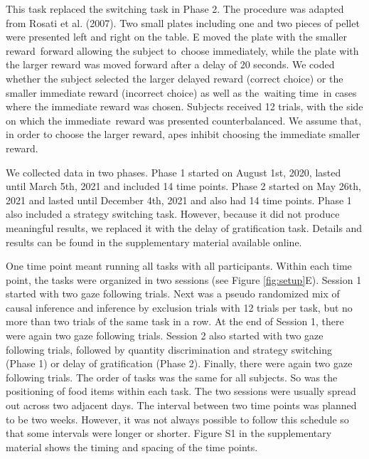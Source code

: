 \documentclass[
  man,floatsintext]{apa6}
\begin{document}
This task replaced the switching task in Phase 2. The procedure was adapted from Rosati et al. (2007). Two small plates including one and two pieces of pellet were presented left and right on the table. E moved the plate with the smaller reward~forward allowing the subject to~choose immediately, while the plate with the larger reward was moved forward after a delay of 20 seconds. We coded whether the subject selected the larger delayed reward (correct choice) or the smaller immediate reward (incorrect choice) as well as the~waiting time~in cases where the immediate reward was chosen. Subjects received 12 trials, with the side on which the immediate~reward was presented counterbalanced. We assume that, in order to choose the larger reward, apes inhibit choosing the immediate smaller reward.

We collected data in two phases. Phase 1 started on August 1st, 2020, lasted until March 5th, 2021 and included 14 time points. Phase 2 started on May 26th, 2021 and lasted until December 4th, 2021 and also had 14 time points. Phase 1 also included a strategy switching task. However, because it did not produce meaningful results, we replaced it with the delay of gratification task. Details and results can be found in the supplementary material available online.

One time point meant running all tasks with all participants. Within each time point, the tasks were organized in two sessions (see Figure \ref{fig:setup}E). Session 1 started with two gaze following trials. Next was a pseudo randomized mix of causal inference and inference by exclusion trials with 12 trials per task, but no more than two trials of the same task in a row. At the end of Session 1, there were again two gaze following trials. Session 2 also started with two gaze following trials, followed by quantity discrimination and strategy switching (Phase 1) or delay of gratification (Phase 2). Finally, there were again two gaze following trials. The order of tasks was the same for all subjects. So was the positioning of food items within each task. The two sessions were usually spread out across two adjacent days. The interval between two time points was planned to be two weeks. However, it was not always possible to follow this schedule so that some intervals were longer or shorter. Figure S1 in the supplementary material shows the timing and spacing of the time points.
\end{document}
